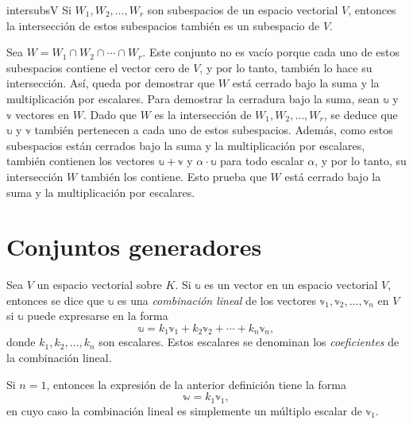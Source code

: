 \begin{theorem}{}{intersubsV}
    Si $W_1, W_2, \dots, W_r$ son subespacios de un espacio vectorial $V$, entonces la intersección de estos subespacios también es un subespacio de $V$.

    \tcblower
    \demostracion Sea $W = W_1 \cap W_2 \cap \cdots \cap W_r$. Este conjunto no es vacío porque cada uno de estos subespacios contiene el vector cero de $V$, y por lo tanto, también lo hace su intersección. Así, queda por demostrar que $W$ está cerrado bajo la suma y la multiplicación por escalares. Para demostrar la cerradura bajo la suma, sean $\mathbb{u}$ y $\mathbb{v}$ vectores en $W$. Dado que $W$ es la intersección de $W_1, W_2, \dots, W_r$, se deduce que $\mathbb{u}$ y $\mathbb{v}$ también pertenecen a cada uno de estos subespacios. Además, como estos subespacios están cerrados bajo la suma y la multiplicación por escalares, también contienen los vectores $\mathbb{u} + \mathbb{v}$ y $\alpha \cdot \mathbb{u}$ para todo escalar $\alpha$, y por lo tanto, su intersección $W$ también los contiene. Esto prueba que $W$ está cerrado bajo la suma y la multiplicación por escalares.
\end{theorem}

\section{Conjuntos generadores}

\begin{definicion}{}{}
    Sea $V$ un espacio vectorial sobre $K$. Si $\mathbb{u}$ es un vector en un espacio vectorial $V$, entonces se dice que $\mathbb{u}$ es una \emph{combinación lineal} de los vectores $\mathbb{v}_1, \mathbb{v}_2, \dots, \mathbb{v}_n$ en $V$ si $\mathbb{u}$ puede expresarse en la forma
    $$\mathbb{u} = k_1 \mathbb{v}_1 + k_2 \mathbb{v}_2 + \cdots + k_n \mathbb{v}_n,$$
    donde $k_1, k_2, \dots, k_n$ son escalares. Estos escalares se denominan los \emph{coeficientes} de la combinación lineal.
\end{definicion}

Si $n = 1$, entonces la expresión de la anterior definición tiene la forma
$$\mathbb{w} = k_1\mathbb{v}_1,$$
en cuyo caso la combinación lineal es simplemente un múltiplo escalar de $\mathbb{v}_1$.

